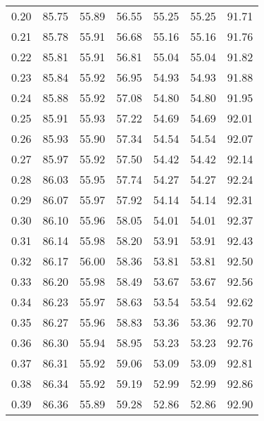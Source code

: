 \begin{tabular}{|c|c|c|c|c|c|c|}
      0.20 &     85.75 &     55.89 &      56.55 &   55.25 &      55.25 &         91.71 \\
      0.21 &     85.78 &     55.91 &      56.68 &   55.16 &      55.16 &         91.76 \\
      0.22 &     85.81 &     55.91 &      56.81 &   55.04 &      55.04 &         91.82 \\
      0.23 &     85.84 &     55.92 &      56.95 &   54.93 &      54.93 &         91.88 \\
      0.24 &     85.88 &     55.92 &      57.08 &   54.80 &      54.80 &         91.95 \\
      0.25 &     85.91 &     55.93 &      57.22 &   54.69 &      54.69 &         92.01 \\
      0.26 &     85.93 &     55.90 &      57.34 &   54.54 &      54.54 &         92.07 \\
      0.27 &     85.97 &     55.92 &      57.50 &   54.42 &      54.42 &         92.14 \\
      0.28 &     86.03 &     55.95 &      57.74 &   54.27 &      54.27 &         92.24 \\
      0.29 &     86.07 &     55.97 &      57.92 &   54.14 &      54.14 &         92.31 \\
      0.30 &     86.10 &     55.96 &      58.05 &   54.01 &      54.01 &         92.37 \\
      0.31 &     86.14 &     55.98 &      58.20 &   53.91 &      53.91 &         92.43 \\
      0.32 &     86.17 &     56.00 &      58.36 &   53.81 &      53.81 &         92.50 \\
      0.33 &     86.20 &     55.98 &      58.49 &   53.67 &      53.67 &         92.56 \\
      0.34 &     86.23 &     55.97 &      58.63 &   53.54 &      53.54 &         92.62 \\
      0.35 &     86.27 &     55.96 &      58.83 &   53.36 &      53.36 &         92.70 \\
      0.36 &     86.30 &     55.94 &      58.95 &   53.23 &      53.23 &         92.76 \\
      0.37 &     86.31 &     55.92 &      59.06 &   53.09 &      53.09 &         92.81 \\
      0.38 &     86.34 &     55.92 &      59.19 &   52.99 &      52.99 &         92.86 \\
      0.39 &     86.36 &     55.89 &      59.28 &   52.86 &      52.86 &         92.90 \\

\end{tabular}
